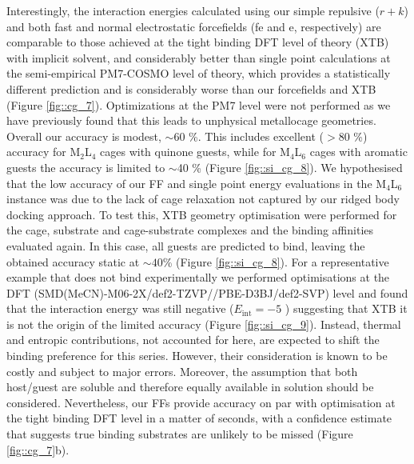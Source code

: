 \documentclass[../../main.tex]{subfiles}
\newcommand{\MLf}{M$_2$L$_4$ }
\newcommand{\MLs}{M$_4$L$_6$ }
\begin{document}
Interestingly, the interaction energies calculated using our simple repulsive ($r+k$) and both fast and normal electrostatic forcefields (fe and e, respectively) are comparable to those achieved at the tight binding DFT level of theory (XTB) with implicit solvent, and considerably better than single point calculations at the semi-empirical PM7-COSMO level of theory, which provides a statistically different prediction and is considerably worse than our forcefields and XTB (Figure \ref{fig::cg_7}). Optimizations at the PM7 level were not performed as we have previously found that this leads to unphysical metallocage geometries.\cite{Young2019} Overall our accuracy is modest, $\sim$60 \%. This includes excellent ($>80$ \%) accuracy for \MLf cages with quinone guests, while for \MLs cages with aromatic guests the accuracy is limited to $\sim$40 \% (Figure \ref{fig::si_cg_8}). We hypothesised that the low accuracy of our FF and single point energy evaluations in the \MLs instance was due to the lack of cage relaxation not captured by our ridged body docking approach. To test this, XTB geometry optimisation were performed for the cage, substrate and cage-substrate complexes and the binding affinities evaluated again. In this case, all guests are predicted to bind, leaving the obtained accuracy static at $\sim40 $\% (Figure \ref{fig::si_cg_8}). For a representative example that does not bind experimentally we performed optimisations at the DFT (SMD(MeCN)-M06-2X/def2-TZVP//PBE-D3BJ/def2-SVP) level and found that the interaction energy was still negative ($E_\text{int} = -5$ \kcal) suggesting that XTB it is not the origin of the limited accuracy (Figure \ref{fig::si_cg_9}). Instead, thermal and entropic contributions, not accounted for here, are expected to shift the binding preference for this series. However, their consideration is known to be costly and subject to major errors. Moreover, the assumption that both host/guest are soluble and therefore equally available in solution should be considered. Nevertheless, our FFs provide accuracy on par with optimisation at the tight binding DFT level in a matter of seconds, with a confidence estimate that suggests true binding substrates are unlikely to be missed (Figure \ref{fig::cg_7}b). 
\end{document}
